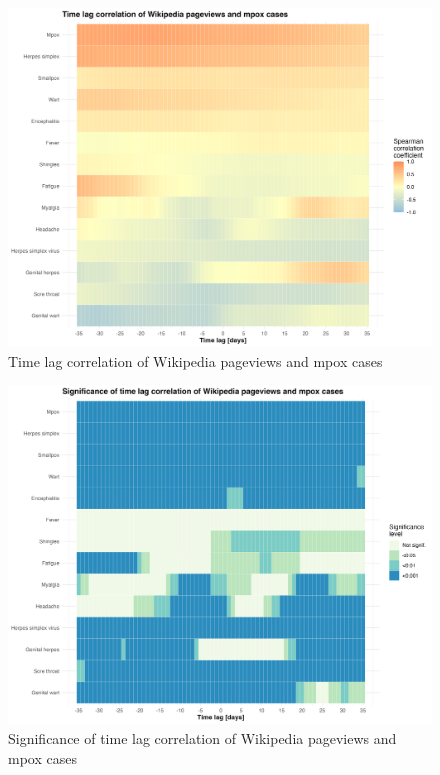 \documentclass[
  12pt,
]{article}
\begin{document}
\begin{figure}[H]

{\centering \includegraphics{images/spearman-correlation-heatmap.png}

}

\caption{Time lag correlation of Wikipedia pageviews and mpox cases}

\end{figure}%
\begin{figure}[H]

{\centering \includegraphics{images/spearman-pvalues-heatmap.png}

}

\caption{Significance of time lag correlation of Wikipedia pageviews and
mpox cases}

\end{figure}%
\end{document}
